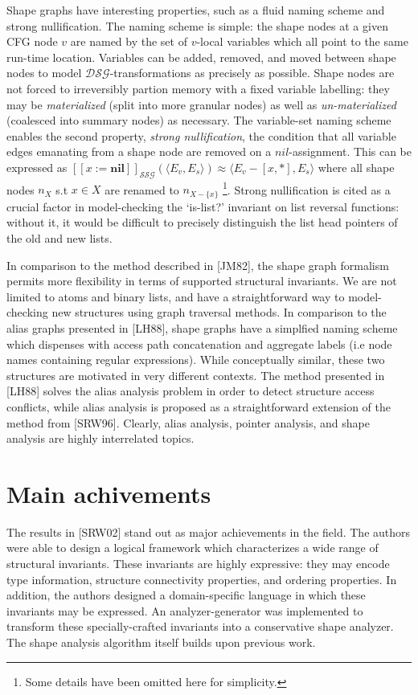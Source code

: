\documentclass{article}
\begin{document}
Shape graphs have interesting properties, such as a fluid naming scheme and
strong nullification. The naming scheme is simple: the shape nodes at a
given CFG node $v$ are named by the set of $v$-local variables which all
point to the same run-time location.  Variables can be added, removed, and
moved between shape nodes to model $\mathcal{DSG}$-transformations as
precisely as possible. Shape nodes are not forced to irreversibly partion
memory with a fixed variable labelling: they may be \textit{materialized}
(split into more granular nodes) as well as \textit{un-materialized}
(coalesced into summary nodes) as necessary.  The variable-set naming scheme
enables the second property, \textit{strong nullification}, the condition
that all variable edges emanating from a shape node are removed on a
$nil$-assignment. This can be expressed as $[\![x :=
\textbf{nil}]\!]_{\mathcal{SSG}}(\langle E_v, E_s \rangle) \approx \langle
E_v - [x, *], E_s \rangle$ where all shape nodes $n_X$ s.t $x \in X$ are
renamed to $n_{X - \{x\}}$ \footnote{Some details have been omitted here for
simplicity.}. Strong nullification is cited as a crucial factor in
model-checking the `is-list?' invariant on list reversal functions: without
it, it would be difficult to precisely distinguish the list head pointers of
the old and new lists.

In comparison to the method described in [JM82], the shape graph formalism
permits more flexibility in terms of supported structural invariants. We are
not limited to atoms and binary lists, and have a straightforward way to
model-checking new structures using graph traversal methods. In comparison
to the alias graphs presented in [LH88], shape graphs have a simplfied
naming scheme which dispenses with access path concatenation and aggregate
labels (i.e node names containing regular expressions). While conceptually
similar, these two structures are motivated in very different contexts. The
method presented in [LH88] solves the alias analysis problem in order to
detect structure access conflicts, while alias analysis is proposed as a
straightforward extension of the method from [SRW96]. Clearly, alias
analysis, pointer analysis, and shape analysis are highly interrelated
topics.

\section{Main achivements}

The results in [SRW02] stand out as major achievements in the field. The
authors were able to design a logical framework which characterizes a wide
range of structural invariants. These invariants are highly expressive: they
may encode type information, structure connectivity properties, and ordering
properties. In addition, the authors designed a domain-specific language in
which these invariants may be expressed. An analyzer-generator was
implemented to transform these specially-crafted invariants into a
conservative shape analyzer. The shape analysis algorithm itself builds upon
previous work.
\end{document}
